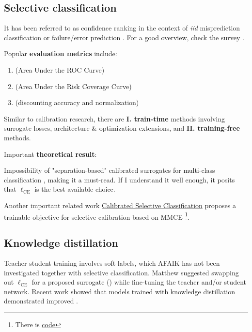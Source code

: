 \subsection{Selective classification}

It has been referred to as confidence ranking in the context of \textit{iid} misprediction classification or failure/error prediction \cite{jaeger2023a}. For a good overview, check the survey \cite{zhang2023survey}. 

\noindent Popular \textbf{evaluation metrics} include:
\begin{enumerate}
    \item \AUROC{} (Area Under the ROC Curve)
    \item \AURC{} (Area Under the Risk Coverage Curve) \citep{geifman2017selective,jaeger2023a} 
    \item \EAURC{} (discounting accuracy and normalization) \citep{geifman2018bias}
\end{enumerate}


\noindent Similar to calibration research, there are \textbf{I. train-time} methods involving surrogate losses, architecture \& optimization extensions, and \textbf{II. training-free} methods.

\noindent Important \textbf{theoretical result}:

Impossibility of "separation-based" calibrated surrogates for multi-class classification \cite[Theorem 4]{ni2019calibration}, making it a must-read. If I understand it well enough, it posits that $\ell_{\mathrm{CE}}$ is the best available choice. 

Another important related work \href{https://arxiv.org/pdf/2208.12084.pdf}{Calibrated Selective Classification} \cite{fisch2022calibrated} proposes a trainable objective for selective calibration based on MMCE \cite{kumar2018trainable} \footnote{There is \href{https://github.com/ajfisch/calibrated-selective-classification}{code}}.


\subsection{Knowledge distillation}

Teacher-student training involves soft labels, which AFAIK has not been investigated together with selective classification. Matthew suggested swapping out $\ell_{\mathrm{CE}}$ for a proposed surrogate () while fine-tuning the teacher and/or student network. 
Recent work \cite{galil2023what} showed that models trained with knowledge distillation demonstrated improved \AURC{}.


